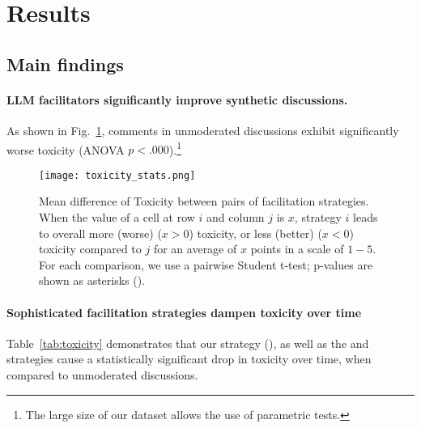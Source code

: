 %

\section{Results}
\label{sec:results}


\subsection{Main findings}
\label{ssec:results:main}

\paragraph{\ac{LLM} facilitators significantly improve synthetic discussions.} As shown in Fig.~\ref{fig:toxicity_stats}, comments in unmoderated discussions exhibit significantly worse toxicity (ANOVA $p<.000$).\footnote{The large size of our dataset allows the use of parametric tests.} 

\begin{figure}
	\texttt{[image: toxicity\_stats.png]}
	\centering
	\caption{Mean difference of Toxicity between pairs of facilitation strategies. When the value of a cell at row $i$ and column $j$ is $x$, strategy $i$ leads to overall more (worse) ($x>0$) toxicity, or less (better) ($x<0$) toxicity compared to $j$ for an average of $x$ points in a scale of $1-5$. For each comparison, we use a pairwise Student t-test; p-values are shown as asterisks (\asterisknote).}
	\label{fig:toxicity_stats}
\end{figure}

\paragraph{Sophisticated facilitation strategies dampen toxicity over time} Table~\ref{tab:toxicity} demonstrates that our strategy (\emph{\strategymodgame}), as well as the \emph{\strategyregroom} and \emph{\strategyconstrcomm} strategies cause a statistically significant drop in toxicity over time, when compared to unmoderated discussions.

